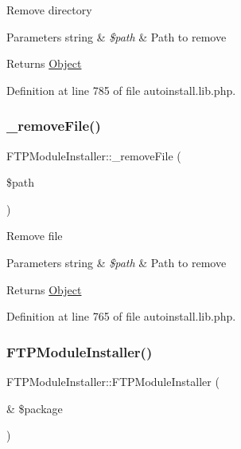 Remove directory 
\begin{DoxyParams}[1]{Parameters}
string & {\em \$path} & Path to remove \\
\hline
\end{DoxyParams}
\begin{DoxyReturn}{Returns}
\hyperlink{classObject}{Object} 
\end{DoxyReturn}


Definition at line 785 of file autoinstall.\+lib.\+php.

\mbox{\label{classFTPModuleInstaller_a97578f8c7903aded9a0141b1d378713b}} 
\subsubsection{\texorpdfstring{\+\_\+remove\+File()}{\_removeFile()}}
{\footnotesize\ttfamily F\+T\+P\+Module\+Installer\+::\+\_\+remove\+File (\begin{DoxyParamCaption}\item[{}]{\$path }\end{DoxyParamCaption})}

Remove file


\begin{DoxyParams}[1]{Parameters}
string & {\em \$path} & Path to remove \\
\hline
\end{DoxyParams}
\begin{DoxyReturn}{Returns}
\hyperlink{classObject}{Object} 
\end{DoxyReturn}


Definition at line 765 of file autoinstall.\+lib.\+php.

\mbox{\label{classFTPModuleInstaller_a77174bd1ad449c30c7f74333921441d6}} 
\subsubsection{\texorpdfstring{F\+T\+P\+Module\+Installer()}{FTPModuleInstaller()}}
{\footnotesize\ttfamily F\+T\+P\+Module\+Installer\+::\+F\+T\+P\+Module\+Installer (\begin{DoxyParamCaption}\item[{\&}]{\$package }\end{DoxyParamCaption})}


